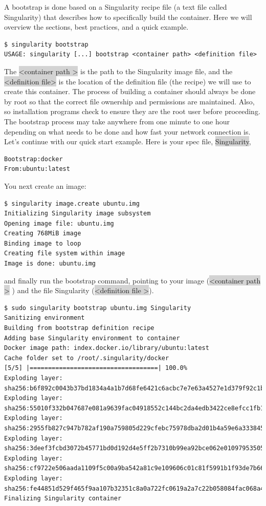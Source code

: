 \documentclass[a4paper]{article}
\begin{document}
	A bootstrap is done based on a Singularity recipe file (a text file called Singularity) that describes how to specifically build the container. Here we will overview the sections, best practices, and a quick example.\\[0.1in]
	
\begin{lstlisting}[frame=single]
$ singularity bootstrap
USAGE: singularity [...] bootstrap <container path> <definition file>
\end{lstlisting}	
The \colorbox{lightgray}{\textless container path \textgreater} is the path to the Singularity image file, and the \colorbox{lightgray}{\textless definition file\textgreater} is the location of the definition file (the recipe) we will use to create this container. The process of building a container should always be done by root so that the correct file ownership and permissions are maintained. Also, so installation programs check to ensure they are the root user before proceeding. The bootstrap process may take anywhere from one minute to one hour depending on what needs to be done and how fast your network connection is.\\[0.1in]
Let’s continue with our quick start example. Here is your spec file, \colorbox{lightgray}{Singularity},
\begin{lstlisting}[frame=single]
Bootstrap:docker
From:ubuntu:latest
\end{lstlisting}

You next create an image:\\[0.1in]
\begin{lstlisting}[frame=single]
$ singularity image.create ubuntu.img
Initializing Singularity image subsystem
Opening image file: ubuntu.img
Creating 768MiB image
Binding image to loop
Creating file system within image
Image is done: ubuntu.img
\end{lstlisting}

and finally run the bootstrap command, pointing to your image (\colorbox{lightgray}{\textless container path \textgreater} ) and the file Singularity (\colorbox{lightgray}{\textless definition file \textgreater}).
\begin{lstlisting}[frame=single]
$ sudo singularity bootstrap ubuntu.img Singularity 
Sanitizing environment
Building from bootstrap definition recipe
Adding base Singularity environment to container
Docker image path: index.docker.io/library/ubuntu:latest
Cache folder set to /root/.singularity/docker
[5/5] |===================================| 100.0% 
Exploding layer: sha256:b6f892c0043b37bd1834a4a1b7d68fe6421c6acbc7e7e63a4527e1d379f92c1b.tar.gz
Exploding layer: sha256:55010f332b047687e081a9639fac04918552c144bc2da4edb3422ce8efcc1fb1.tar.gz
Exploding layer: sha256:2955fb827c947b782af190a759805d229cfebc75978dba2d01b4a59e6a333845.tar.gz
Exploding layer: sha256:3deef3fcbd3072b45771bd0d192d4e5ff2b7310b99ea92bce062e01097953505.tar.gz
Exploding layer: sha256:cf9722e506aada1109f5c00a9ba542a81c9e109606c01c81f5991b1f93de7b66.tar.gz
Exploding layer: sha256:fe44851d529f465f9aa107b32351c8a0a722fc0619a2a7c22b058084fac068a4.tar.gz
Finalizing Singularity container
\end{lstlisting}
\end{document}
